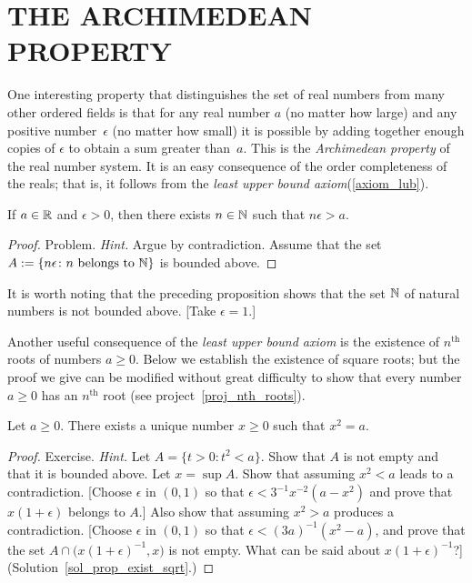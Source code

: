 \section{THE ARCHIMEDEAN PROPERTY}

One interesting property that distinguishes the set of real numbers from many other ordered
fields is that for any real number $a$ (no matter how large) and any positive
number~$\epsilon$ (no matter how small) it is possible by adding together enough copies of
$\epsilon$ to obtain a sum greater than~$a$.  This is the \emph{Archimedean property} of the
real number system.  It is an easy consequence of the order completeness of the reals; that
is, it  follows from the \emph{least upper bound axiom}(\ref{axiom_lub}).

\begin{prop}\label{arch_prop}
If $a \in \mathbb{R}$ and $\epsilon > 0$, then there exists $n \in \mathbb{N}$ such that $n\epsilon > a$.
\end{prop}

\begin{proof} Problem.  \emph{Hint.}  Argue by contradiction.  Assume that the set
$A := \{n\epsilon \colon n \text{ belongs to }\mathbb{N}\}$ is bounded above.   \ns
\end{proof}

It is worth noting that the preceding proposition shows that the set $\mathbb{N}$ of natural numbers
is not bounded above. [Take  $\epsilon = 1$.]

Another useful consequence of the \emph{least upper bound axiom} is the existence of
$n^{\text{th}}$ roots of numbers $a \ge 0$. Below we establish the existence of square roots;
but the proof we give can be modified without great difficulty to show that every number $a
\ge 0$ has an $n^{\text{th}}$ root (see project~\ref{proj_nth_roots}).

\begin{prop}\label{prop_exist_sqrt}  Let $a \ge 0$.  There exists a unique number $x \ge 0$
such that $x^2 = a$.
\end{prop}

\begin{proof} Exercise. \emph{Hint.}  Let $A = \{t > 0 \colon t^2 < a\}$. Show that $A$ is
not empty and that it is bounded above. Let $x = \sup A$.  Show that assuming $x^2 < a$ leads
to a contradiction. [Choose  $\epsilon$ in $(0, 1)$ so that $\epsilon < 3^{-1} x^{-2}(a -
x^2)$ and prove that $ x(1 + \epsilon)$ belongs to $A$.]  Also show that assuming $x^2 > a$
produces a contradiction. [Choose $\epsilon$ in $(0, 1)$ so that $\epsilon < (3a)^{-1}(x^2 -
a)$, and prove that the set $A \cap \bigl(x(1 + \epsilon)^{-1}, x\bigr)$ is not empty. What
can be said about $x(1 + \epsilon)^{-1}$?] (Solution~\ref{sol_prop_exist_sqrt}.) \ns
\end{proof}


